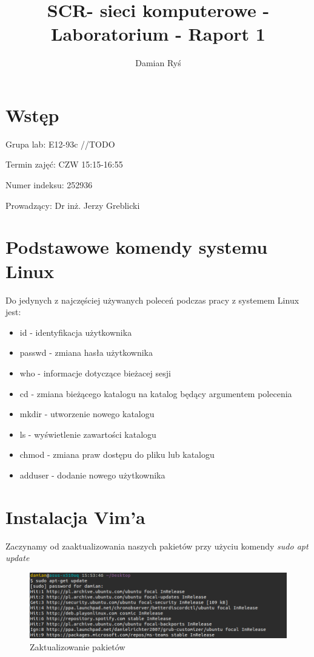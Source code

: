 \documentclass{article}
\title{SCR- sieci komputerowe - Laboratorium - Raport 1}
\author{Damian Ryś}
\begin{document}
\maketitle


\tableofcontents
\section{Wstęp}
\hspace*{0.5cm}Grupa lab: E12-93c	//TODO

Termin zajęć: CZW 15:15-16:55

Numer indeksu: 252936

Prowadzący: Dr inż. Jerzy Greblicki 
\section{Podstawowe komendy systemu Linux}
Do jedynych z najczęściej używanych poleceń podczas pracy z systemem Linux jest:
\begin{itemize}
    \item id - identyfikacja użytkownika
    \item passwd - zmiana hasła użytkownika
    \item who - informacje dotyczące bieżacej sesji
    \item cd - zmiana bieżącego katalogu na katalog będący argumentem polecenia
    \item mkdir - utworzenie nowego katalogu
    \item ls - wyświetlenie zawartości katalogu
    \item chmod - zmiana praw dostępu do pliku lub katalogu
    \item adduser - dodanie nowego użytkownika
\end{itemize}

\section{Instalacja Vim'a}
Zaczynamy od zaaktualizowania naszych pakietów przy użyciu
komendy \textit{sudo apt update}

\begin{figure}[H]
    \centering
    \includegraphics[totalheight=3cm]{data/sudoUpdate.png}
    \caption{Zaktualizowanie pakietów }
    \label{2}
\end{figure}
\end{document}
